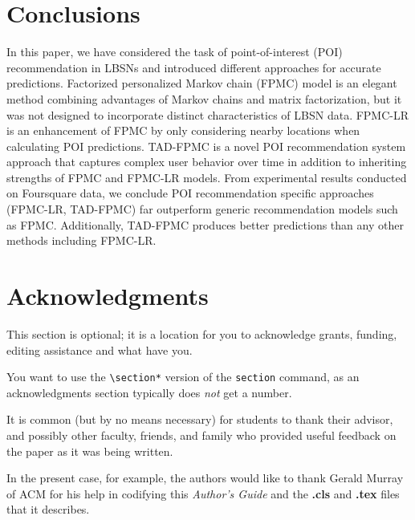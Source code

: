 \documentclass{sig-alternate}
\begin{document}
\section{Conclusions}
\label{sec:conclusions}

In this paper, we have considered the task of point-of-interest (POI) recommendation in LBSNs 
and introduced different approaches for accurate predictions. Factorized personalized Markov 
chain (FPMC) model is an elegant method combining advantages of Markov chains and matrix factorization,
but it was not designed to incorporate distinct characteristics of LBSN data. FPMC-LR is an enhancement 
of FPMC by only considering nearby locations when calculating POI predictions. TAD-FPMC is a novel 
POI recommendation system approach that captures complex user behavior over time in addition to inheriting strengths 
of FPMC and FPMC-LR models. From experimental results conducted on Foursquare data, we conclude 
POI recommendation specific approaches (FPMC-LR, TAD-FPMC) far outperform generic recommendation models such as FPMC.
Additionally, TAD-FPMC produces better predictions than any other methods including FPMC-LR.


\section*{Acknowledgments}
\label{sec:acknowledgments}

This section is optional; it is a location for you
to acknowledge grants, funding, editing assistance and
what have you.

You want to use the \texttt{\textbackslash section*} version of the \texttt{section}
command, as an acknowledgments section typically does \emph{not} get
a number.

It is common (but by no means necessary) for students to thank
their advisor, and possibly other faculty, friends, and family who provided
useful feedback on the paper as it was being written.

In the present case, for example, the
authors would like to thank Gerald Murray of ACM for
his help in codifying this \textit{Author's Guide}
and the \textbf{.cls} and \textbf{.tex} files that it describes.


  
\end{document}
